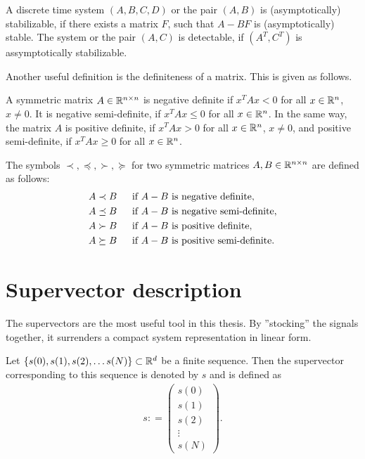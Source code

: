 \begin{defi}
A discrete time system $(A, B, C, D)$ or the pair $(A, B)$ is (asymptotically) stabilizable, if there exists a matrix $F$, such that $A - BF$ is (asymptotically) stable.
The system or the pair $(A,C)$ is detectable, if $(A^T, C^T)$ is assymptotically stabilizable. 
\end{defi}

Another useful definition is the definiteness of a matrix. This is given as follows. 
\begin{defi}
	A symmetric matrix $A \in {\mathbb{R}}^{n \times n}$ is negative definite if $x^T A x < 0$ for all $x \in {\mathbb{R}}^n$, $x \neq 0$. It is negative semi-definite, if $x^T A x \leq 0$ for all $x \in {\mathbb{R}}^n$. 
	In the same way, the matrix $A$ is positive definite, if $x^T A x >0$ for all $x \in {\mathbb{R}}^n$, $x \neq 0$, and positive semi-definite, if $x^T A x \geq 0$ for all $x \in {\mathbb{R}}^n$. 
	
	The symbols $\prec, \preceq, \succ, \succeq$ for two symmetric matrices $A, B \in {\mathbb{R}}^{n \times n}$ are defined as follows:
	\begin{subequations}
		\begin{align}
		A \prec B & \text{ \; \; if } A - B \text{ is negative definite},
		\\
		A \preceq B & \text{ \; \; if } A - B \text{ is negative semi-definite},		
		\\
		A \succ B & \text{ \; \; if } A - B \text{ is positive definite},
		\\
		A \succeq B & \text{ \; \; if } A - B \text{ is positive semi-definite}.
		\end{align}
	\end{subequations}
\end{defi}

\section{Supervector description} 

The supervectors are the most useful tool in this thesis. By ''stocking'' the signals together, it surrenders a compact system representation in linear form.

\begin{defi}
	Let $\{s(0), s(1), s(2), \dots s(N)\} \subset {\mathbb{R}}^{d}$ be a finite sequence. Then the supervector corresponding to this sequence is denoted by $s$ and is defined as 
	\begin{align}
	s: = \begin{pmatrix}
	s(0) \\ s(1) \\ s(2) \\ \vdots \\ s(N)
	\end{pmatrix}.
	\end{align}
\end{defi}

